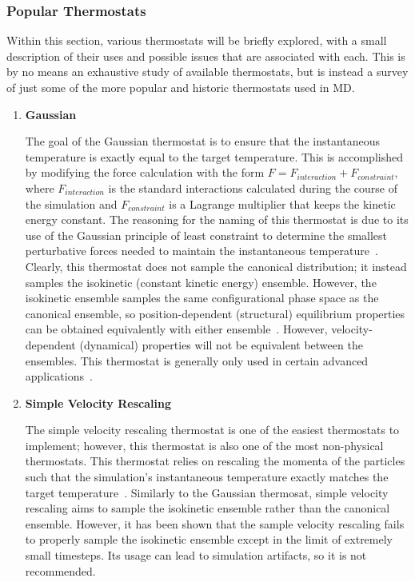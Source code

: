 \documentclass[9pt,bestpractices]{livecoms}
\begin{document}
\subsubsection{Popular Thermostats}
Within this section, various thermostats will be briefly explored, with a small description of their uses and possible issues that are associated with each.
This is by no means an exhaustive study of available thermostats, but is instead a survey of just some of the more popular and historic thermostats used in MD.

\begin{enumerate}[listparindent=\parindent]

    \item \textbf{Gaussian}
        
        The goal of the Gaussian thermostat is to ensure that the instantaneous temperature is exactly equal to the target temperature.
        This is accomplished by modifying the force calculation with the form $F = F_{interaction} + F_{constraint}$, where $F_{interaction}$ is the standard interactions calculated during the course of the simulation and $F_{constraint}$ is a Lagrange multiplier that keeps the kinetic energy constant.
        The reasoning for the naming of this thermostat is due to its use of the Gaussian principle of least constraint to determine the smallest perturbative forces needed to maintain the instantaneous temperature~\cite{thermostatAlgorithms2005}.
        Clearly, this thermostat does not sample the canonical distribution; it instead samples the isokinetic (constant kinetic energy) ensemble.
        However, the isokinetic ensemble samples the same configurational phase space as the canonical ensemble, so position-dependent (structural) equilibrium properties can be obtained equivalently with either ensemble~\cite{Minary:2003:JChemPhysAlgorithms}.
        However, velocity-dependent (dynamical) properties will not be equivalent between the ensembles.
        This thermostat is generally only used in certain advanced applications~\cite{Minary:2003:JChemPhysAlgorithms}.

    \item \textbf{Simple Velocity Rescaling}

        The simple velocity rescaling thermostat is one of the easiest thermostats to implement; however, this thermostat is also one of the most non-physical thermostats.
        This thermostat relies on rescaling the momenta of the particles such that the simulation's instantaneous temperature exactly matches the target temperature~\cite{thermostatAlgorithms2005}.
        Similarly to the Gaussian thermosat, simple velocity rescaling aims to sample the isokinetic ensemble rather than the canonical ensemble.
        However, it has been shown that the sample velocity rescaling fails to properly sample the isokinetic ensemble except in the limit of extremely small timesteps\cite{Braun:2018}.
        Its usage can lead to simulation artifacts, so it is not recommended\cite{Harvey:1998:JCompChem,Braun:2018}.


\end{enumerate}
\end{document}
